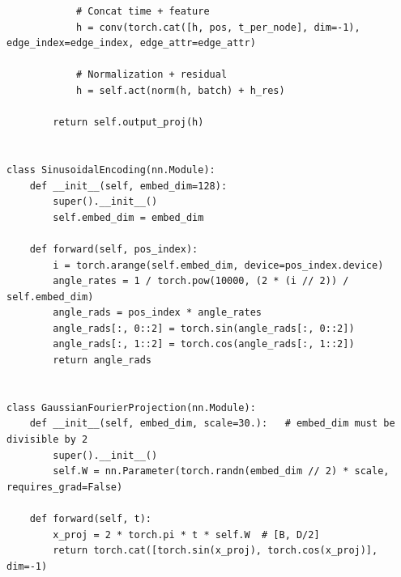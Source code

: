\documentclass[a4paper,12pt]{article}
\begin{document}
\begin{verbatim}
            # Concat time + feature
            h = conv(torch.cat([h, pos, t_per_node], dim=-1), edge_index=edge_index, edge_attr=edge_attr)

            # Normalization + residual
            h = self.act(norm(h, batch) + h_res)

        return self.output_proj(h)


class SinusoidalEncoding(nn.Module):
    def __init__(self, embed_dim=128):
        super().__init__()
        self.embed_dim = embed_dim

    def forward(self, pos_index):
        i = torch.arange(self.embed_dim, device=pos_index.device)
        angle_rates = 1 / torch.pow(10000, (2 * (i // 2)) / self.embed_dim)
        angle_rads = pos_index * angle_rates
        angle_rads[:, 0::2] = torch.sin(angle_rads[:, 0::2])
        angle_rads[:, 1::2] = torch.cos(angle_rads[:, 1::2])
        return angle_rads


class GaussianFourierProjection(nn.Module):
    def __init__(self, embed_dim, scale=30.):   # embed_dim must be divisible by 2
        super().__init__()
        self.W = nn.Parameter(torch.randn(embed_dim // 2) * scale, requires_grad=False)

    def forward(self, t):
        x_proj = 2 * torch.pi * t * self.W  # [B, D/2]
        return torch.cat([torch.sin(x_proj), torch.cos(x_proj)], dim=-1)
\end{verbatim}

\clearpage



\end{document}
